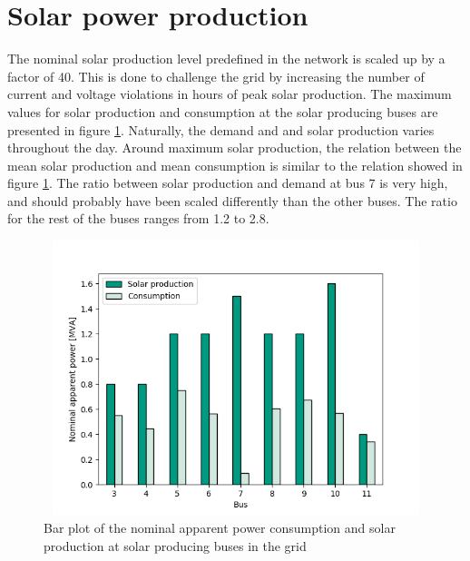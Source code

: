 \documentclass[class=book, crop=false, 11pt]{standalone}
\begin{document}
\section{Solar power production}
The nominal solar production level predefined in the network is scaled up by a factor of 40. This is done to challenge the grid by increasing the number of current and voltage violations in hours of peak solar production. The maximum values for solar production and consumption at the solar producing buses are presented in figure \ref{fig:discussion:nominal_sgen}. Naturally, the demand and and solar production varies throughout the day. Around maximum solar production, the relation between the mean solar production and mean consumption is similar to the relation showed in figure \ref{fig:discussion:nominal_sgen}. The ratio between solar production and demand at bus 7 is very high, and should probably have been scaled differently than the other buses. The ratio for the rest of the buses ranges from 1.2 to 2.8. 

\begin{figure}[h]
    \center
\includegraphics[height=8cm, width=12cm]{figures/nominal_sgen.png}
    \caption[size = 9]{Bar plot of the nominal apparent power consumption and solar production at solar producing buses in the grid}
    \label{fig:discussion:nominal_sgen}
\end{figure}
\end{document}
